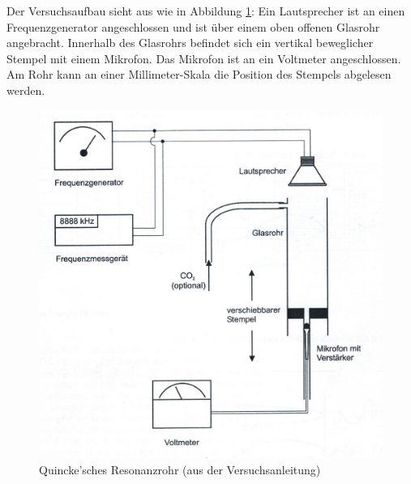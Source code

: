 \documentclass{scrartcl}
\begin{document}
Der Versuchsaufbau sieht aus wie in Abbildung \ref{fig:Quincke}: Ein Lautsprecher ist an einen Frequenzgenerator angeschlossen und ist über einem oben offenen Glasrohr angebracht. Innerhalb des Glasrohrs befindet sich ein vertikal beweglicher Stempel mit einem Mikrofon. Das Mikrofon ist an ein Voltmeter angeschlossen. Am Rohr kann an einer Millimeter-Skala die Position des Stempels abgelesen werden.

\begin{figure}[h]
  \centering
    \includegraphics[scale=0.50]{Quincke.PNG}
  \caption{Quincke'sches Resonanzrohr (aus der Versuchsanleitung)}
  \label{fig:Quincke}
\end{figure}
\end{document}
